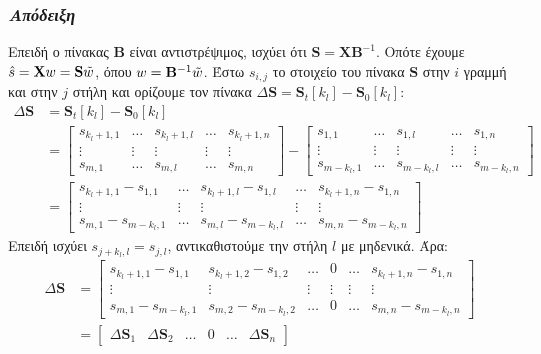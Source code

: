 \subsubsection*{\small{\textit{Απόδειξη}}}
Επειδή ο πίνακας $\mathbf{B}$ είναι αντιστρέψιμος, ισχύει ότι $\mathbf{S} = \mathbf{X} \mathbf{B}^{-1}$. Οπότε έχουμε $\hat{s} = \mathbf{X} w = \mathbf{S} \Tilde{w}$, όπου $ w = \mathbf{B}^{-1} \Tilde{w}$. Έστω $s_{i,j}$ το στοιχείο του πίνακα $\mathbf{S}$ στην $i$ γραμμή και στην $j$ στήλη και ορίζουμε τον πίνακα $\Delta\mathbf{S} = \mathbf{S}_t[k_l] - \mathbf{S}_0[k_l]$:
\begin{align*}
\Delta\mathbf{S} &= \mathbf{S}_t[k_l] - \mathbf{S}_0[k_l] \\
&= \begin{bmatrix}
    s_{k_l+1,1} & \ldots & s_{k_l+1,l} & \ldots & s_{k_l+1,n} \\
    \vdots & \vdots & \vdots & \vdots & \vdots \\
    s_{m,1} & \ldots & s_{m,l} & \ldots & s_{m,n}
    \end{bmatrix} -
    \begin{bmatrix}
    s_{1,1} & \ldots & s_{1,l} & \ldots & s_{1,n} \\
    \vdots & \vdots & \vdots & \vdots & \vdots \\
    s_{m-k_l,1} & \ldots & s_{m-k_l,l} & \ldots & s_{m-k_l,n}
    \end{bmatrix} \\
&= \begin{bmatrix}
    s_{k_l+1,1}-s_{1,1} & \ldots & s_{k_l+1,l}-s_{1,l} & \ldots & s_{k_l+1,n}-s_{1,n} \\
    \vdots & \vdots & \vdots & \vdots & \vdots \\
    s_{m,1}-s_{m-k_l,1} & \ldots & s_{m,l}-s_{m-k_l,l} & \ldots & s_{m,n}-s_{m-k_l,n}
    \end{bmatrix}
\end{align*}
Επειδή ισχύει $s_{j+k_l,l} = s_{j,l}$, αντικαθιστούμε την στήλη $l$ με μηδενικά. Άρα:
\begin{align*}
\Delta \mathbf{S} &=
    \begin{bmatrix}
    s_{k_l+1,1}-s_{1,1} & s_{k_l+1,2}-s_{1,2} & \ldots & 0 & \ldots & s_{k_l+1,n}-s_{1,n} \\
    \vdots & \vdots & \vdots & \vdots & \vdots & \vdots \\
    s_{m,1}-s_{m-k_l,1} & s_{m,2}-s_{m-k_l,2} & \ldots & 0 & \ldots & s_{m,n}-s_{m-k_l,n}
    \end{bmatrix} \\
&= \begin{bmatrix}
\Delta \mathbf{S}_1 & \Delta \mathbf{S}_2 & \ldots & 0 & \ldots & 
\Delta \mathbf{S}_n
\end{bmatrix}
\end{align*}
